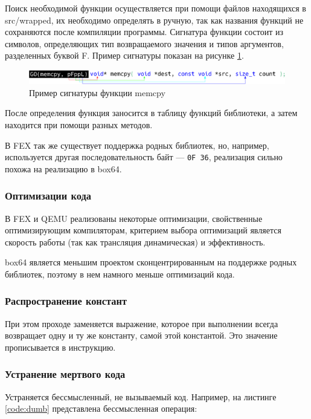 Поиск необходимой функции осуществляется при помощи файлов находящихся в src/wrapped, их необходимо определять в ручную, так как названия функций не сохраняются после компиляции программы. Сигнатура функции состоит из символов, определяющих тип возвращаемого значения и типов аргументов, разделенных буквой F. Пример сигнатуры показан на рисунке \ref{fig:box64sig}.

\begin{figure}[hbtp]
	\centering
	\includegraphics[width=\textwidth]{img/function.eps}
	\caption{Пример сигнатуры функции memcpy}
	\label{fig:box64sig}
\end{figure}

После определения функция заносится в таблицу функций библиотеки, а затем находится при помощи разных методов. \cite{box64_deep}

В FEX так же существует поддержка родных библиотек, но, например, используется другая последовательность байт --- \texttt{0F 36}, реализация сильно похожа на реализацию в box64.

\subsubsection{Оптимизации кода}

В FEX и QEMU реализованы некоторые оптимизации, свойственные оптимизирующим компиляторам, критерием выбора оптимизаций является скорость работы (так как трансляция динамическая) и эффективность.

box64 является меньшим проектом сконцентрированным на поддержке родных библиотек, поэтому в нем намного меньше оптимизаций кода.

\subsubsection{Распространение констант}

При этом проходе заменяется выражение, которое при выполнении всегда возвращает одну и ту же константу, самой этой константой. Это значение прописывается в инструкцию.

\subsubsection{Устранение мертвого кода}

Устраняется бессмысленный, не вызываемый код.
Например, на листинге \ref{code:dumb} представлена бессмысленная операция:

